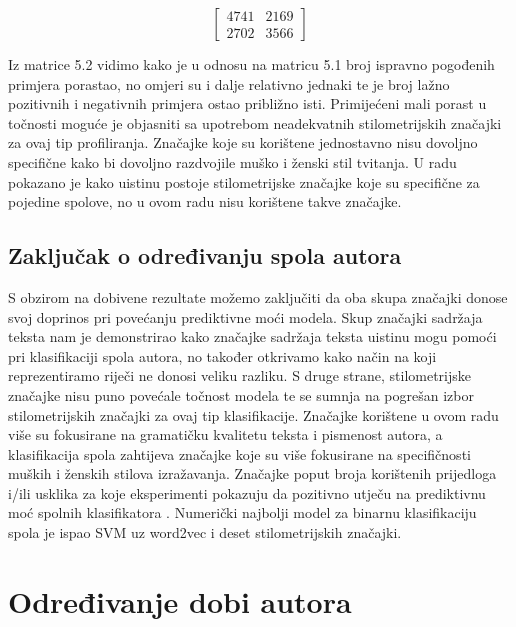 \documentclass[times, utf8, zavrsni]{fer}
\begin{document}
\begin{equation}
\begin{bmatrix}
4741 & 2169 \\
2702 & 3566
\end{bmatrix}
\end{equation}\newline

Iz matrice 5.2 vidimo kako je u odnosu na matricu 5.1 broj ispravno pogođenih primjera porastao, no omjeri su i dalje relativno jednaki te je broj lažno pozitivnih i negativnih primjera ostao približno  isti. Primijećeni mali porast u točnosti moguće je objasniti sa upotrebom neadekvatnih stilometrijskih značajki za ovaj tip profiliranja. Značajke koje su korištene jednostavno nisu dovoljno specifične kako bi dovoljno razdvojile muško i ženski stil tvitanja. U radu \citep{rangel2013} pokazano je kako uistinu postoje stilometrijske značajke koje su specifične za pojedine spolove, no u ovom radu nisu korištene takve značajke.

\newpage
\subsection*{Zaključak o određivanju spola autora}

S obzirom na dobivene rezultate možemo zaključiti da oba skupa značajki donose svoj doprinos pri povećanju prediktivne moći modela. Skup značajki sadržaja teksta nam je demonstrirao kako značajke sadržaja teksta uistinu mogu pomoći pri klasifikaciji spola autora, no također otkrivamo kako način na koji reprezentiramo  riječi ne donosi veliku razliku. S druge strane, stilometrijske značajke nisu puno povećale točnost modela te se sumnja na pogrešan izbor stilometrijskih značajki za ovaj tip klasifikacije. Značajke korištene u ovom radu više su fokusirane na gramatičku kvalitetu teksta i pismenost autora, a klasifikacija spola zahtijeva značajke koje su više fokusirane na specifičnosti muških i ženskih stilova izražavanja. Značajke poput broja korištenih prijedloga i/ili usklika za koje eksperimenti pokazuju da pozitivno utječu na prediktivnu moć spolnih klasifikatora \citep{rangel2013}. Numerički najbolji model za binarnu klasifikaciju spola je ispao SVM uz word2vec i deset stilometrijskih značajki.


\section{Određivanje dobi autora}
\end{document}
